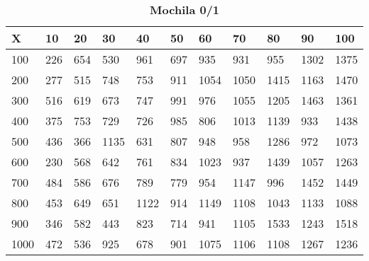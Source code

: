 \documentclass[10pt,letterpaper]{article}
\begin{document}
\newpage 
{}
\begin{center}
\begin{table}\renewcommand{\arraystretch}{2.5}
\caption{\large \textbf{Mochila 0/1}}
\centering
\begin{tabular} { |m{0.5cm}|m{1.3cm}|m{1.3cm}|m{1.3cm}|m{1.3cm}|m{1.3cm}|m{1.3cm}|m{1.3cm}|m{1.3cm}|m{1.3cm}|m{1.3cm}|} 
\hline
\rowcolor{Gray}
\centering \textbf{X} & \centering \textbf{10} & \centering \textbf{20} & \centering \textbf{30}\ & \centering \textbf{40} & \centering \textbf{50} & \centering \textbf{60}\ & \centering \textbf{70} & \centering \textbf{80} & \centering \textbf{90}\ & \textbf{100} \\\hline
\cellcolor{Gray}100 & \Large 226 & \Large 654 & \Large 530 & \Large 961 & \Large 697 & \Large 935 & \Large 931 & \Large 955 & \Large 1302 & \Large 1375 \\
\hline
\cellcolor{Gray}200 & \Large 277 & \Large 515 & \Large 748 & \Large 753 & \Large 911 & \Large 1054 & \Large 1050 & \Large 1415 & \Large 1163 & \Large 1470 \\
\hline
\cellcolor{Gray}300 & \Large 516 & \Large 619 & \Large 673 & \Large 747 & \Large 991 & \Large 976 & \Large 1055 & \Large 1205 & \Large 1463 & \Large 1361 \\
\hline
\cellcolor{Gray}400 & \Large 375 & \Large 753 & \Large 729 & \Large 726 & \Large 985 & \Large 806 & \Large 1013 & \Large 1139 & \Large 933 & \Large 1438 \\
\hline
\cellcolor{Gray}500 & \Large 436 & \Large 366 & \Large 1135 & \Large 631 & \Large 807 & \Large 948 & \Large 958 & \Large 1286 & \Large 972 & \Large 1073 \\
\hline
\cellcolor{Gray}600 & \Large 230 & \Large 568 & \Large 642 & \Large 761 & \Large 834 & \Large 1023 & \Large 937 & \Large 1439 & \Large 1057 & \Large 1263 \\
\hline
\cellcolor{Gray}700 & \Large 484 & \Large 586 & \Large 676 & \Large 789 & \Large 779 & \Large 954 & \Large 1147 & \Large 996 & \Large 1452 & \Large 1449 \\
\hline
\cellcolor{Gray}800 & \Large 453 & \Large 649 & \Large 651 & \Large 1122 & \Large 914 & \Large 1149 & \Large 1108 & \Large 1043 & \Large 1133 & \Large 1088 \\
\hline
\cellcolor{Gray}900 & \Large 346 & \Large 582 & \Large 443 & \Large 823 & \Large 714 & \Large 941 & \Large 1105 & \Large 1533 & \Large 1243 & \Large 1518 \\
\hline
\cellcolor{Gray}1000 & \Large 472 & \Large 536 & \Large 925 & \Large 678 & \Large 901 & \Large 1075 & \Large 1106 & \Large 1108 & \Large 1267 & \Large 1236 \\
\hline
\end{tabular} \\
\end{table}
\end{center}
\newpage 
{}
\end{document}

